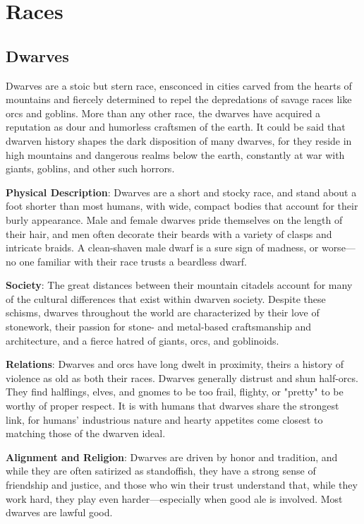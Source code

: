 
\chapter{Races}
\section{Dwarves}

\label{f0}				
Dwarves are a stoic but stern race, ensconced in cities carved from the hearts of mountains and fiercely determined to repel the depredations of savage races like orcs and goblins. More than any other race, the dwarves have acquired a reputation as dour and humorless craftsmen of the earth. It could be said that dwarven history shapes the dark disposition of many dwarves, for they reside in high mountains and dangerous realms below the earth, constantly at war with giants, goblins, and other such horrors. 
				
\textbf{Physical Description}: Dwarves are a short and stocky race, and stand about a foot shorter than most humans, with wide, compact bodies that account for their burly appearance. Male and female dwarves pride themselves on the length of their hair, and men often decorate their beards with a variety of clasps and intricate braids. A clean-shaven male dwarf is a sure sign of madness, or worse---no one familiar with their race trusts a beardless dwarf.
				
\textbf{Society}: The great distances between their mountain citadels account for many of the cultural differences that exist within dwarven society. Despite these schisms, dwarves throughout the world are characterized by their love of stonework, their passion for stone- and metal-based craftsmanship and architecture, and a fierce hatred of giants, orcs, and goblinoids.
				
\textbf{Relations}: Dwarves and orcs have long dwelt in proximity, theirs a history of violence as old as both their races. Dwarves generally distrust and shun half-orcs. They find halflings, elves, and gnomes to be too frail, flighty, or "pretty" to be worthy of proper respect. It is with humans that dwarves share the strongest link, for humans' industrious nature and hearty appetites come closest to matching those of the dwarven ideal. 
				
\textbf{Alignment and Religion}: Dwarves are driven by honor and tradition, and while they are often satirized as standoffish, they have a strong sense of friendship and justice, and those who win their trust understand that, while they work hard, they play even harder---especially when good ale is involved. Most dwarves are lawful good.
				
